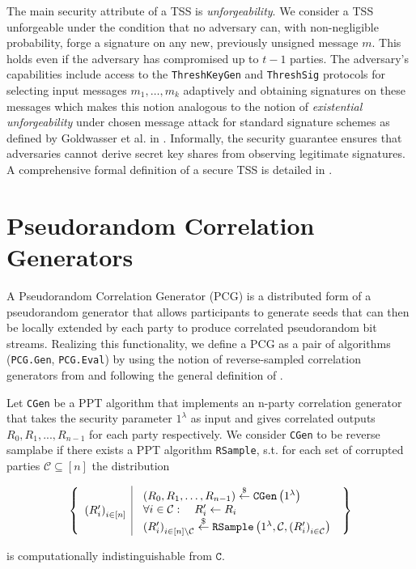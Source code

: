 The main security attribute of a TSS is \textit{unforgeability}. We consider a TSS unforgeable under the condition that no adversary can, with non-negligible probability, forge a signature on any new, previously unsigned message $m$. This holds even if the adversary has compromised up to $t-1$ parties. The adversary's capabilities include access to the \texttt{\textup{ThreshKeyGen}} and \texttt{\textup{ThreshSig}} protocols for selecting input messages $m_1,\ldots,m_k$ adaptively and obtaining signatures on these messages which makes this notion analogous to the notion of \textit{existential unforgeability} under chosen message attack for standard signature schemes as defined by Goldwasser et al. in \cite{goldwasser1988digital}. Informally, the security guarantee ensures that adversaries cannot derive secret key shares from observing legitimate signatures. A comprehensive formal definition of a secure TSS is detailed in \cite{gennaro1996theory}.

\section{Pseudorandom Correlation Generators}
\label{sec:prelim_PCGs}
A Pseudorandom Correlation Generator (PCG) is a distributed form of a pseudorandom generator that allows participants to generate seeds that can then be locally extended by each party to produce correlated pseudorandom bit streams. Realizing this functionality, we define a PCG as a pair of algorithms (\texttt{PCG.Gen}, \texttt{PCG.Eval}) by using the notion of reverse-sampled correlation generators from \cite{boyle2020efficient} and following the general definition of \cite{abram2022low}.

\begin{definition}
Let \texttt{\textup{CGen}} be a PPT algorithm that implements an n-party correlation generator that takes the security parameter $1^\lambda$ as input and gives correlated outputs $R_0, R_1,..., R_{n-1}$ for each party respectively. We consider \texttt{\textup{CGen}} to be reverse samplabe if there exists a PPT algorithm \texttt{\textup{RSample}}, s.t. for each set of corrupted parties $\mathcal{C} \subseteq [n]$ the distribution 

$$
\left\{\begin{array}{l|l}
\left(R_i^{\prime}\right)_{i \in[n]} & \begin{array}{l}
\left(R_0, R_1, \ldots, R_{n-1}\right) \stackrel{\$}{\leftarrow} \texttt{\textup{CGen}}\left(1^\lambda\right) \\
\forall i \in \mathcal{C}: \quad R_i^{\prime} \leftarrow R_i \\
\left(R_i^{\prime}\right)_{i \in [n]\setminus\mathcal{C}} \stackrel{\$}{\leftarrow} \texttt{\textup{RSample}}\left(1^\lambda, \mathcal{C},\left(R_i^{\prime}\right)_{i \in \mathcal{C}}\right)
\end{array}
\end{array}\right\}
$$

is computationally indistinguishable from $\texttt{C}$.
\end{definition}

